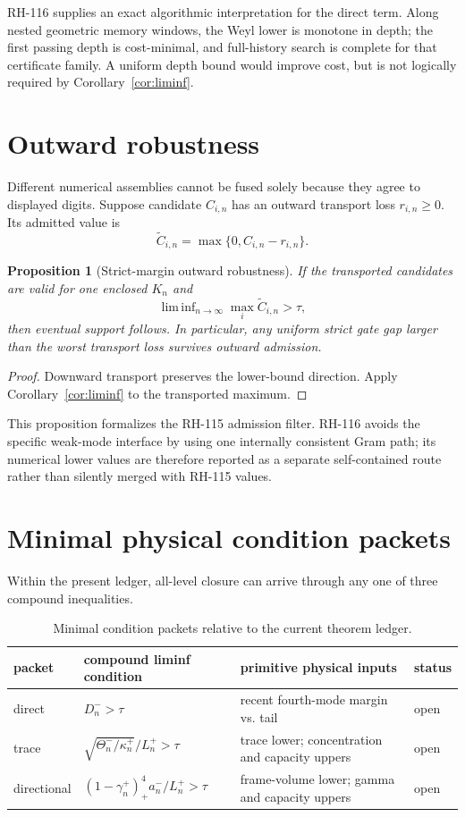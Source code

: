 \documentclass[12pt]{article}
\newtheorem{proposition}[theorem]{Proposition}
\newcommand{\liminfv}{\mathop{\mathrm{lim\,inf}}}
\begin{document}
RH-116 supplies an exact algorithmic interpretation for the direct term.
Along nested geometric memory windows, the Weyl lower is monotone in depth;
the first passing depth is cost-minimal, and full-history search is complete
for that certificate family.  A uniform depth bound would improve cost, but
is not logically required by Corollary~\ref{cor:liminf}.

\section{Outward robustness}
Different numerical assemblies cannot be fused solely because they agree to
displayed digits.  Suppose candidate $C_{i,n}$ has an outward transport loss
$r_{i,n}\geq0$.  Its admitted value is
\[
 \widetilde C_{i,n}=\max\{0,C_{i,n}-r_{i,n}\}.
\]

\begin{proposition}[Strict-margin outward robustness]\label{prop:outward}
If the transported candidates are valid for one enclosed $K_n$ and
\[
 \liminfv_{n\to\infty}\max_i\widetilde C_{i,n}>\tau,
\]
then eventual support follows.  In particular, any uniform strict gate gap
larger than the worst transport loss survives outward admission.
\end{proposition}
\begin{proof}
Downward transport preserves the lower-bound direction.  Apply
Corollary~\ref{cor:liminf} to the transported maximum.
\end{proof}

This proposition formalizes the RH-115 admission filter.  RH-116 avoids the
specific weak-mode interface by using one internally consistent Gram path;
its numerical lower values are therefore reported as a separate
self-contained route rather than silently merged with RH-115 values.

\section{Minimal physical condition packets}
Within the present ledger, all-level closure can arrive through any one of
three compound inequalities.

\begin{table}[h]
\centering
\small
\begin{tabular}{@{}lp{}p{}l@{}}
\toprule
packet & compound liminf condition & primitive physical inputs & status\\
\midrule
direct & $D_n^->\tau$ & recent fourth-mode margin vs. tail & open\\
trace & $\sqrt{\Theta_n^-/\kappa_n^+}/L_n^+>\tau$
 & trace lower; concentration and capacity uppers & open\\
directional & $(1-\gamma_n^+)_+^4a_n^-/L_n^+>\tau$
 & frame-volume lower; gamma and capacity uppers & open\\
\bottomrule
\end{tabular}
\caption{Minimal condition packets relative to the current theorem ledger.}
\end{table}
\end{document}
